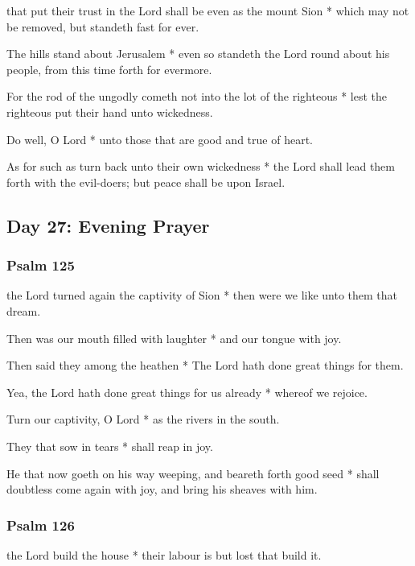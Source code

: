 
 that put their trust in the Lord shall be even as the mount Sion * which may not be removed, but standeth fast for ever.

The hills stand about Jerusalem * even so standeth the Lord round about his people, from this time forth for evermore.

For the rod of the ungodly cometh not into the lot of the righteous * lest the righteous put their hand unto wickedness.

Do well, O Lord * unto those that are good and true of heart.

As for such as turn back unto their own wickedness * the Lord shall lead them forth with the evil-doers; but peace shall be upon Israel.

\subsection{Day 27: Evening Prayer}

\subsubsection{Psalm 125}


 the Lord turned again the captivity of Sion * then were we like unto them that dream.

Then was our mouth filled with laughter * and our tongue with joy.

Then said they among the heathen * The Lord hath done great things for them.

Yea, the Lord hath done great things for us already * whereof we rejoice.

Turn our captivity, O Lord * as the rivers in the south.

They that sow in tears * shall reap in joy.

He that now goeth on his way weeping, and beareth forth good seed * shall doubtless come again with joy, and bring his sheaves with him.

\subsubsection{Psalm 126}


 the Lord build the house * their labour is but lost that build it.

